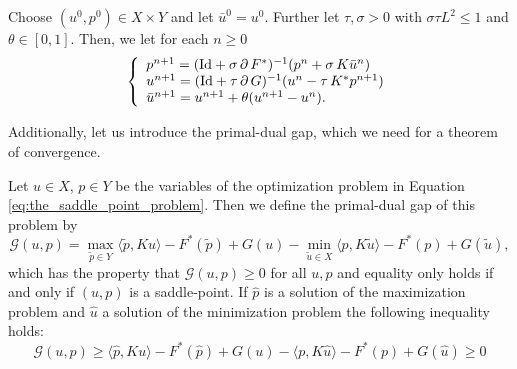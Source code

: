     \begin{algorithm}
    \label{alg:fast_primal_dual_algorithm}
        Choose $(u^{0}, p^{0}) \in X \times Y$ and let $\bar{u}^{0} = u^{0}$. Further let $\tau, \sigma > 0$ with $\sigma\tau L^{2} \le 1$ and $\theta \in [0, 1]$. Then, we let for each $n \ge 0$
            \begin{equation}
                \left\{ 
                    \begin{array}{l l}
                        p^{n+1} = (\textnormal{Id} + \sigma\,\partial\,F^{\ast})^{-1}(p^{n} + \sigma\,K\bar{u}^{n}) \\
                        u^{n+1} = (\textnormal{Id} + \tau\,\partial\,G)^{-1}(u^{n} - \tau\,K^{\ast}p^{n+1}) \\
                        \bar{u}^{n+1} = u^{n+1} + \theta (u^{n+1} - u^{n}).
                    \end{array}
                \right.
            \label{eq:fast_primal_dual_algorithm}
            \end{equation}
    \end{algorithm}

    Additionally, let us introduce the primal-dual gap, which we need for a theorem of convergence.
    \begin{definition} %
    \label{def:primal_dual_gap}

        Let $u \in X$, $p \in Y$ be the variables of the optimization problem in Equation \ref{eq:the_saddle_point_problem}. Then we define the primal-dual gap of this problem by
            \begin{equation}
                \mathcal{G}(u, p) = \max_{\tilde{p} \in Y} \langle \tilde{p}, Ku \rangle - F^{\ast}(\tilde{p}) + G(u) - \min_{\tilde{u} \in X} \langle p, K\tilde{u} \rangle - F^{\ast}(p) + G(\tilde{u}),
                \label{eq:primal_dual_gap}
            \end{equation}
        which has the property that $\mathcal{G}(u, p) \ge 0$ for all $u, p$ and equality only holds if and only if $(u, p)$ is a saddle-point. If $\hat{p}$ is a solution of the maximization problem and $\hat{u}$ a solution of the minimization problem the following inequality holds:
            \begin{equation}
                \mathcal{G}(u, p) \ge \langle \hat{p}, Ku \rangle - F^{\ast}(\hat{p}) + G(u) - \langle p, K\hat{u} \rangle - F^{\ast}(p) + G(\hat{u}) \ge 0
                \label{eq:primal_dual_gap}
            \end{equation}
    \end{definition}

